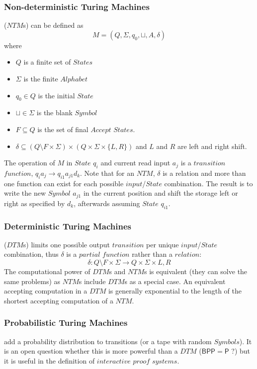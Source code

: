 \documentclass{article}
\begin{document}
\subsubsection{Non-deterministic Turing Machines} ($NTM$s) can be defined
as
    \[
        M = (Q, \Sigma, q_0, \sqcup, A, \delta)
    \]
where
\begin{itemize}
\item $Q$ is a finite set of $States$
\item $\Sigma$ is the finite $Alphabet$
\item $q_0 \in Q$ is the initial $State$
\item $\sqcup \in \Sigma$ is the blank $Symbol$
\item $F \subseteq Q$ is the set of final $Accept$ $States$.
\item $\delta \subseteq (Q \setminus F \times \Sigma) \times (Q \times
  \Sigma \times \{L,R\})$ and $L$ and $R$ are left and right shift.
\end{itemize}
The operation of $M$ in $State$ $q_i$ and current read input $a_j$ is
a $transition$ $function$, $q_i a_j \rightarrow q_{i1} a_{j1}
d_k$. Note that for an $NTM$, $\delta$ is a relation and more than one
function can exist for each possible $input$/$State$ combination. The
result is to write the new $Symbol$ $a_{j1}$ in the current position
and shift the storage left or right as specified by $d_k$, afterwards
assuming $State$ $q_{i1}$.

\subsubsection{Deterministic Turing Machines} ($DTM$s) limits one possible
output $transition$ per unique $input$/$State$ combination, thus
$\delta$ is a $partial$ $function$ rather than a $relation$:
\[
    \delta : Q \setminus F \times \Sigma \rightarrow Q \times
    \Sigma \times {L,R}
\]
The computational power of $DTM$s and $NTM$s is equivalent (they can
solve the same problems) as $NTM$s include $DTM$s as a special
case. An equivalent accepting computation in a $DTM$ is generally
exponential to the length of the shortest accepting computation of a
$NTM$.

\subsubsection{Probabilistic Turing Machines} add a probability
distribution to transitions (or a tape with random $Symbols$). It is
an open question whether this is more powerful than a $DTM$
($\mathsf{BPP}=\mathsf{P}$ ?) but it is useful in the definition of
$interactive$ $proof$ $systems$.
\end{document}
